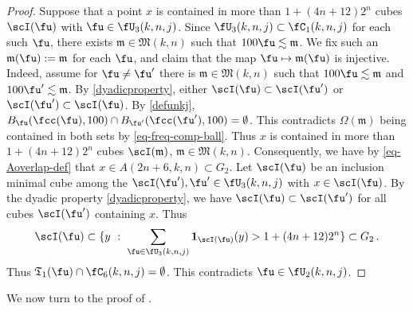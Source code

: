 \begin{proof}
    Suppose that a point $x$ is contained in more than $1 + (4n + 12)2^n$ cubes $\scI(\fu)$ with $\fu \in \fU_3(k,n,j)$. Since $\fU_3(k,n,j) \subset \fC_1(k,n,j)$ for each such $\fu$, there exists $\mathfrak{m} \in \mathfrak{M}(k,n)$ such that $100\fu \lesssim \mathfrak{m}$. We fix such an $\mathfrak{m}(\fu) := \mathfrak{m}$ for each $\fu$, and claim that the map $\fu \mapsto\mathfrak{m}(\fu)$ is injective. Indeed, assume for $\fu\neq \fu'$ there is $\mathfrak{m} \in \mathfrak{M}(k,n)$ such that $100\fu \lesssim \mathfrak{m}$ and $100\fu' \lesssim \mathfrak{m}$. By \eqref{dyadicproperty}, either $\scI(\fu) \subset \scI(\fu')$ or $\scI(\fu') \subset \scI(\fu)$. By \eqref{defunkj}, $B_{\fu}(\fcc(\fu),100) \cap B_{\fu'}(\fcc(\fu'), 100) = \emptyset$. This contradicts $\Omega(\mathfrak{m})$ being contained in both sets by \eqref{eq-freq-comp-ball}. Thus $x$ is contained in more than $1 + (4n + 12)2^n$ cubes $\scI(\mathfrak{m})$, $\mathfrak{m} \in \mathfrak{M}(k,n)$. Consequently, we have by \eqref{eq-Aoverlap-def} that $x \in A(2n + 6, k,n) \subset G_2$. Let $\scI(\fu)$ be an inclusion minimal cube among the $\scI(\fu'), \fu' \in \fU_3(k,n,j)$ with $x \in \scI(\fu)$. By the dyadic property \eqref{dyadicproperty}, we have $\scI(\fu) \subset \scI(\fu')$ for all cubes $\scI(\fu')$ containing $x$. Thus
    $$
        \scI(\fu) \subset \{y \ : \ \sum_{\fu \in \fU_3(k,n,j)} \mathbf{1}_{\scI(\fu)}(y) > 1 + (4n+12)2^{n}\} \subset G_2\,.
    $$
    Thus $\mathfrak{T}_1(\fu) \cap \fC_6(k,n,j) = \emptyset$.
    This contradicts $\fu \in \fU_2(k,n,j)$.
\end{proof}
We now turn to the proof of .

